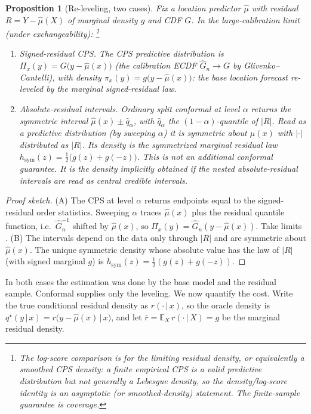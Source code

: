 \documentclass[11pt]{article}
\newtheorem{proposition}{Proposition}
\theoremstyle{definition}
\newcommand{\E}{\mathbb{E}}
\newcommand{\given}{\,\vert\,}
\begin{document}
\begin{proposition}[Re-leveling, two cases]\label{prop:relevel}
Fix a location predictor $\hat\mu$ with residual $R=Y-\hat\mu(X)$ of marginal density
$g$ and CDF $G$. In the large-calibration limit (under exchangeability):%
\footnote{The log-score comparison is for the limiting residual density, or equivalently a
smoothed CPS density: a finite empirical CPS is a valid predictive distribution but not
generally a Lebesgue density, so the density/log-score identity is an asymptotic (or
smoothed-density) statement. The finite-sample guarantee is coverage.}
\begin{enumerate}
\item[(A)] Signed-residual CPS. The CPS predictive distribution is
$\Pi_x(y)=G\big(y-\hat\mu(x)\big)$ (the calibration ECDF $\widehat G_n\to G$ by
Glivenko--Cantelli), with density $\pi_x(y)=g\big(y-\hat\mu(x)\big)$: the base location
forecast re-leveled by the marginal signed-residual law.
\item[(B)] Absolute-residual intervals. Ordinary split conformal at
level $\alpha$ returns the symmetric interval $\hat\mu(x)\pm \hat q_\alpha$, with
$\hat q_\alpha$ the $(1-\alpha)$-quantile of $|R|$. Read as a predictive distribution
(by sweeping $\alpha$) it is symmetric about $\hat\mu(x)$ with $|{\cdot}|$ distributed as
$|R|$. Its density is the \emph{symmetrized} marginal residual law
$h_{\mathrm{sym}}(z)=\tfrac12\big(g(z)+g(-z)\big)$. This is not an additional conformal
guarantee. It is the density implicitly obtained if the nested absolute-residual intervals
are read as central credible intervals.
\end{enumerate}
\end{proposition}

\begin{proof}[Proof sketch]
(A) The CPS at level $\alpha$ returns endpoints equal to the signed-residual order
statistics. Sweeping $\alpha$ traces $\hat\mu(x)$ plus the residual quantile function,
i.e.\ $\widehat G_n^{-1}$ shifted by $\hat\mu(x)$, so $\Pi_x(y)=\widehat G_n(y-\hat\mu(x))$.
Take limits \citep{vovk2019nonparametric}. (B) The intervals depend on the data only
through $|R|$ and are symmetric about $\hat\mu(x)$. The unique symmetric density whose
absolute value has the law of $|R|$ (with signed marginal $g$) is
$h_{\mathrm{sym}}(z)=\tfrac12(g(z)+g(-z))$.
\end{proof}

In both cases the estimation was done by the base model and the residual sample. Conformal
supplies only the leveling. We now quantify the cost. Write the true conditional residual
density as $r(\cdot\given x)$, so the oracle density is
$q^\star(y\given x)=r\big(y-\hat\mu(x)\given x\big)$, and let
$\bar r=\E_X\,r(\cdot\given X)=g$ be the marginal residual density.
\end{document}
